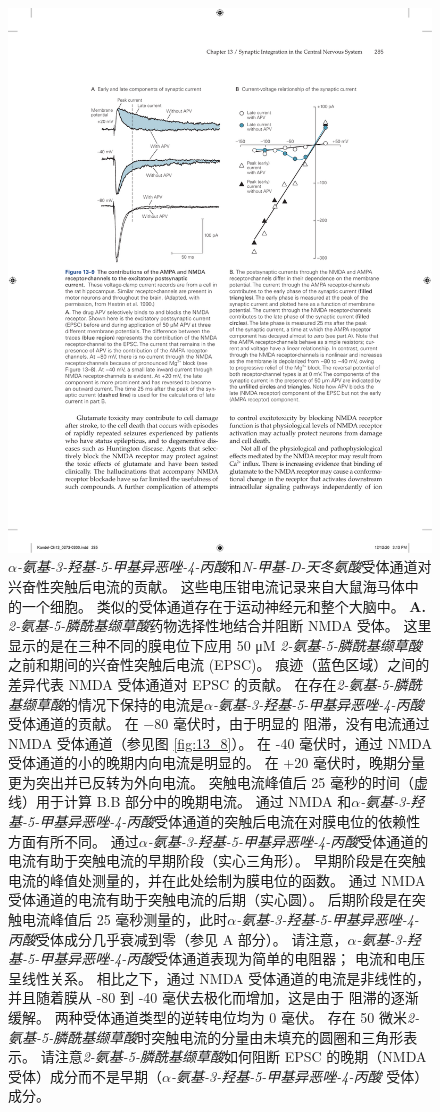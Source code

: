 \begin{figure}[htbp]
	\centering
	\includegraphics[width=0.75\linewidth]{chap13/fig_13_9}
	\caption{\textit{$\alpha$-氨基-3-羟基-5-甲基异恶唑-4-丙酸}和\textit{N-甲基-D-天冬氨酸}受体通道对兴奋性突触后电流的贡献。 这些电压钳电流记录来自大鼠海马体中的一个细胞。 类似的受体通道存在于运动神经元和整个大脑中\cite{hestrin1990analysis}。
	\textbf{A.} \textit{2-氨基-5-膦酰基缬草酸}药物选择性地结合并阻断 NMDA 受体。
	这里显示的是在三种不同的膜电位下应用 50 μM \textit{2-氨基-5-膦酰基缬草酸}之前和期间的兴奋性突触后电流 (EPSC)。
	痕迹（蓝色区域）之间的差异代表 NMDA 受体通道对 EPSC 的贡献。 在存在\textit{2-氨基-5-膦酰基缬草酸}的情况下保持的电流是\textit{$\alpha$-氨基-3-羟基-5-甲基异恶唑-4-丙酸}受体通道的贡献。
	在 −80 毫伏时，由于明显的  阻滞，没有电流通过 NMDA 受体通道（参见图 \ref{fig:13_8}）。
	在 -40 毫伏时，通过 NMDA 受体通道的小的晚期内向电流是明显的。 
	在 +20 毫伏时，晚期分量更为突出并已反转为外向电流。
	突触电流峰值后 25 毫秒的时间（虚线）用于计算 B.B 部分中的晚期电流。
	通过 NMDA 和\textit{$\alpha$-氨基-3-羟基-5-甲基异恶唑-4-丙酸}受体通道的突触后电流在对膜电位的依赖性方面有所不同。
	通过\textit{$\alpha$-氨基-3-羟基-5-甲基异恶唑-4-丙酸}受体通道的电流有助于突触电流的早期阶段（实心三角形）。
	早期阶段是在突触电流的峰值处测量的，并在此处绘制为膜电位的函数。
	通过 NMDA 受体通道的电流有助于突触电流的后期（实心圆）。
	后期阶段是在突触电流峰值后 25 毫秒测量的，此时\textit{$\alpha$-氨基-3-羟基-5-甲基异恶唑-4-丙酸}受体成分几乎衰减到零（参见 A 部分）。
	请注意，\textit{$\alpha$-氨基-3-羟基-5-甲基异恶唑-4-丙酸}受体通道表现为简单的电阻器； 电流和电压呈线性关系。
	相比之下，通过 NMDA 受体通道的电流是非线性的，并且随着膜从 -80 到 -40 毫伏去极化而增加，这是由于  阻滞的逐渐缓解。
	两种受体通道类型的逆转电位均为 0 毫伏。
	存在 50 微米\textit{2-氨基-5-膦酰基缬草酸}时突触电流的分量由未填充的圆圈和三角形表示。
	请注意\textit{2-氨基-5-膦酰基缬草酸}如何阻断 EPSC 的晚期（NMDA 受体）成分而不是早期（\textit{$\alpha$-氨基-3-羟基-5-甲基异恶唑-4-丙酸} 受体）成分。}
	\label{fig:13_9}
\end{figure}


